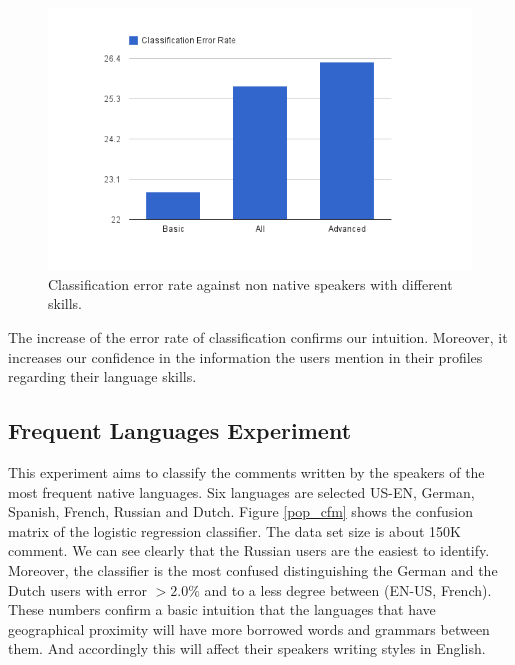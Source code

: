 \documentclass[10pt,a5paper,twoside]{article}
\begin{document}
\begin{figure}
\centering
\includegraphics[scale=0.50]{fluency.png}
\caption{Classification error rate against non native speakers with different
skills.}
\label{fluency}
\end{figure}

The increase of the error rate of classification confirms our intuition.
Moreover, it increases our confidence in the information the users mention in
their profiles regarding their language skills.

\subsection{Frequent Languages Experiment}
This experiment aims to classify the comments written by the speakers of the most frequent native languages.
Six languages are selected US-EN, German, Spanish, French, Russian and Dutch.
Figure \ref{pop_cfm} shows the confusion matrix of the logistic regression
classifier. The data set size is about 150K comment. We can see clearly that the
Russian users are the easiest to identify. Moreover, the classifier is the most
confused distinguishing the German and the Dutch users with error $>2.0\%$ and
to a less degree between (EN-US, French). These numbers confirm a basic
intuition that the languages that have geographical proximity will have more
borrowed words and grammars between them. And accordingly this will affect their speakers writing styles in English.
\end{document}
